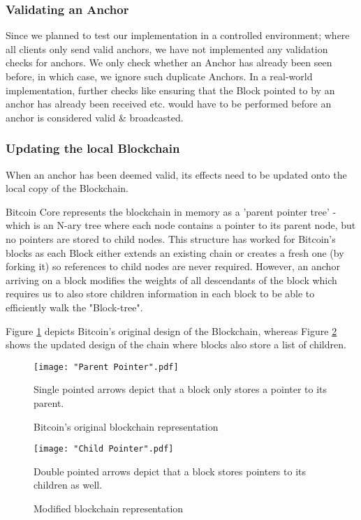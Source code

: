 \subsubsection{Validating an Anchor}

Since we planned to test our implementation in a controlled environment; where all clients only send valid anchors, we have not implemented any validation checks for anchors. 
We only check whether an Anchor has already been seen before, in which case, we ignore such duplicate Anchors.
In a real-world implementation, further checks like ensuring that the Block pointed to by an anchor has already been received etc. would have to be performed before an anchor is considered valid \& broadcasted.

\subsubsection{Updating the local Blockchain}

When an anchor has been deemed valid, its effects need to be updated onto the local copy of the Blockchain.

Bitcoin Core represents the blockchain in memory as a 'parent pointer tree' - which is an N-ary tree where each node contains a pointer to its parent node, but no pointers are stored to child nodes. 
This structure has worked for Bitcoin's blocks as each Block either extends an existing chain or creates a fresh one (by forking it) so references to child nodes are never required.
However, an anchor arriving on a block modifies the weights of all descendants of the block which requires us to also store children information in each block to be able to efficiently walk the "Block-tree".

Figure \ref{fig-impl-parent-pointer} depicts Bitcoin's original design of the Blockchain, whereas 
Figure \ref{fig-impl-child-pointer} shows the updated design of the chain where blocks also store a list of children.

\begin{figure}[!htb]
    \centering
    \texttt{[image: "Parent Pointer".pdf]}
    \caption{Bitcoin's original blockchain representation}
    
    \medskip
    \footnotesize
    Single pointed arrows depict that a block only stores a pointer to its parent.
    \label{fig-impl-parent-pointer}
\end{figure}

\begin{figure}[!htb]
    \centering
    \texttt{[image: "Child Pointer".pdf]}
    \caption{Modified blockchain representation}
    
    \medskip
    \footnotesize
    Double pointed arrows depict that a block stores pointers to its children as well.
    \label{fig-impl-child-pointer}
\end{figure}

